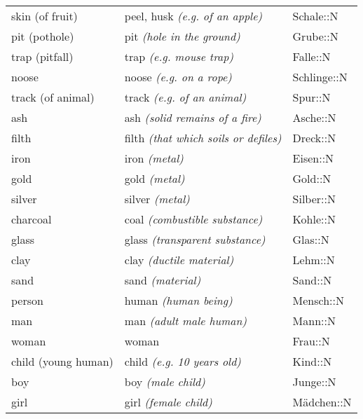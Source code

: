 \begin{center}
\begin{longtable}{lll}
{\sc \lowercase{	SKIN \footnotesize (OF FRUIT)	}}	&	peel, husk	\textit{\footnotesize (e.g. of an apple)}	&	Schale::N	\\
{\sc \lowercase{	PIT \footnotesize (POTHOLE)	}}	&	pit	\textit{\footnotesize (hole in the ground)}	&	Grube::N	\\
{\sc \lowercase{	TRAP \footnotesize (PITFALL)	}}	&	trap	\textit{\footnotesize (e.g. mouse trap)}	&	Falle::N	\\
{\sc \lowercase{	NOOSE	}}	&	noose	\textit{\footnotesize (e.g. on a rope)}	&	Schlinge::N	\\
{\sc \lowercase{	TRACK \footnotesize (OF ANIMAL)	}}	&	track	\textit{\footnotesize (e.g. of an animal)}	&	Spur::N	\\
{\sc \lowercase{	ASH	}}	&	ash	\textit{\footnotesize (solid remains of a fire)}	&	Asche::N	\\
{\sc \lowercase{	FILTH	}}	&	filth	\textit{\footnotesize (that which soils or defiles)}	&	Dreck::N	\\
{\sc \lowercase{	IRON	}}	&	iron	\textit{\footnotesize (metal)}	&	Eisen::N	\\
{\sc \lowercase{	GOLD	}}	&	gold	\textit{\footnotesize (metal)}	&	Gold::N	\\
{\sc \lowercase{	SILVER	}}	&	silver	\textit{\footnotesize (metal)}	&	Silber::N	\\
{\sc \lowercase{	CHARCOAL	}}	&	coal	\textit{\footnotesize (combustible substance)}	&	Kohle::N	\\
{\sc \lowercase{	GLASS	}}	&	glass	\textit{\footnotesize (transparent substance)}	&	Glas::N	\\
{\sc \lowercase{	CLAY	}}	&	clay	\textit{\footnotesize (ductile material)}	&	Lehm::N	\\
{\sc \lowercase{	SAND	}}	&	sand	\textit{\footnotesize (material)}	&	Sand::N	\\
{\sc \lowercase{	PERSON	}}	&	human	\textit{\footnotesize (human being)}	&	Mensch::N	\\
{\sc \lowercase{	MAN	}}	&	man	\textit{\footnotesize (adult male human)}	&	Mann::N	\\
{\sc \lowercase{	WOMAN	}}	&	woman		&	Frau::N	\\
{\sc \lowercase{	CHILD \footnotesize (YOUNG HUMAN)	}}	&	child	\textit{\footnotesize (e.g. 10 years old)}	&	Kind::N	\\
{\sc \lowercase{	BOY	}}	&	boy	\textit{\footnotesize (male child)}	&	Junge::N	\\
{\sc \lowercase{	GIRL	}}	&	girl	\textit{\footnotesize (female child)}	&	Mädchen::N	\\

\end{longtable}
\end{center}
